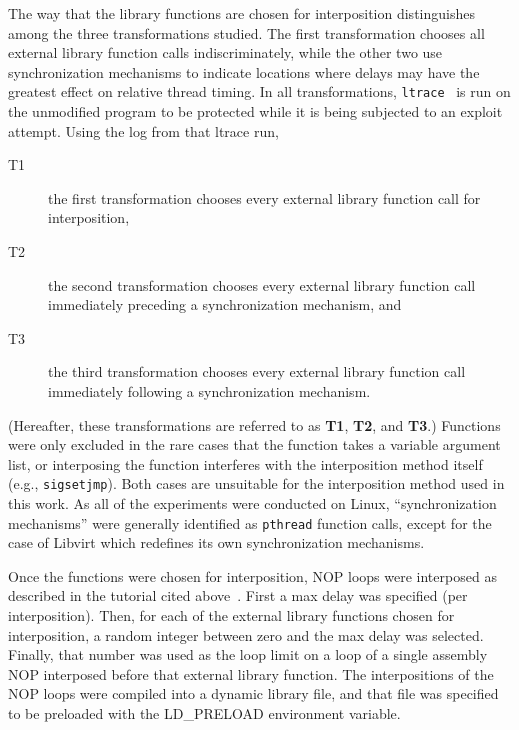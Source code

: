 The way that the library functions are chosen for interposition distinguishes among the three transformations studied.
The first transformation chooses all external library function calls indiscriminately, while the other two use synchronization mechanisms to indicate locations where delays may have the greatest effect on relative thread timing.
In all transformations, \texttt{ltrace}~\cite{cespedesltrace} is run on the unmodified program to be protected while it is being subjected to an exploit attempt.
Using the log from that ltrace run,
\begin{description}
	\item[T1] the first transformation chooses every external library function call for interposition,
	\item[T2] the second transformation chooses every external library function call immediately preceding a synchronization mechanism, and
	\item[T3] the third transformation chooses every external library function call immediately following a synchronization mechanism.
\end{description}
(Hereafter, these transformations are referred to as \textbf{T1}, \textbf{T2}, and \textbf{T3}.)
Functions were only excluded in the rare cases that the function takes a
variable argument list, or interposing the function interferes with the
interposition method itself (e.g., \texttt{sigsetjmp}).
Both cases are unsuitable for the interposition method used in this work.
As all of the experiments were conducted on Linux, ``synchronization
mechanisms'' were generally identified as \texttt{pthread} function calls, except for the case of Libvirt which redefines its own synchronization mechanisms.

Once the functions were chosen for interposition, NOP loops were interposed as described in the tutorial cited above~\cite{Conrod2009}.
First a max delay was specified (per interposition).
Then, for each of the external library functions chosen for interposition, a random integer between zero and the max delay was selected.
Finally, that number was used as the loop limit on a loop of a single assembly NOP interposed before that external library function.
The interpositions of the NOP loops were compiled into a dynamic library file, and that file was specified to be preloaded with the LD\_PRELOAD environment variable.

